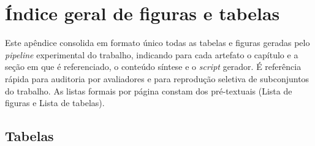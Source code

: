 \chapter{\'Indice geral de figuras e tabelas}
\label{ap:indice}

Este ap\^endice consolida em formato \'unico todas as tabelas e
figuras geradas pelo \emph{pipeline} experimental do trabalho,
indicando para cada artefato o cap\'itulo e a se\c{c}\~ao em que \'e
referenciado, o conte\'udo s\'intese e o \emph{script} gerador. \'E
refer\^encia r\'apida para auditoria por avaliadores e para
reprodu\c{c}\~ao seletiva de subconjuntos do trabalho. As listas
formais por p\'agina constam dos pr\'e-textuais (Lista de figuras e
Lista de tabelas).

\section{Tabelas}
\label{sec:ap_tabelas}

